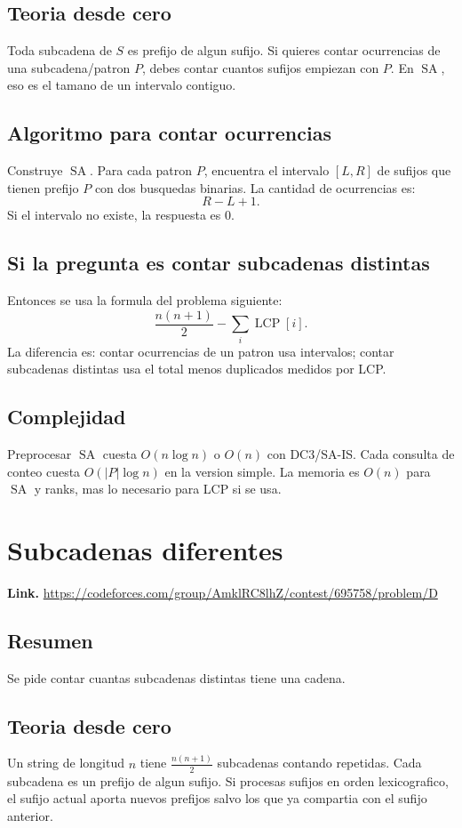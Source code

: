 \documentclass[10pt]{article}
\newcommand{\bigO}{O}
\newcommand{\SA}{\operatorname{SA}}
\newcommand{\LCP}{\operatorname{LCP}}
\begin{document}
\subsection*{Teoria desde cero}
Toda subcadena de $S$ es prefijo de algun sufijo. Si quieres contar ocurrencias
de una subcadena/patron $P$, debes contar cuantos sufijos empiezan con $P$. En
$\SA$, eso es el tamano de un intervalo contiguo.

\subsection*{Algoritmo para contar ocurrencias}
Construye $\SA$. Para cada patron $P$, encuentra el intervalo $[L,R]$ de sufijos
que tienen prefijo $P$ con dos busquedas binarias. La cantidad de ocurrencias es:
\[
R-L+1.
\]
Si el intervalo no existe, la respuesta es $0$.

\subsection*{Si la pregunta es contar subcadenas distintas}
Entonces se usa la formula del problema siguiente:
\[
\frac{n(n+1)}2-\sum_i \LCP[i].
\]
La diferencia es: contar ocurrencias de un patron usa intervalos; contar
subcadenas distintas usa el total menos duplicados medidos por LCP.

\subsection*{Complejidad}
Preprocesar $\SA$ cuesta $\bigO(n\log n)$ o $\bigO(n)$ con DC3/SA-IS. Cada
consulta de conteo cuesta $\bigO(|P|\log n)$ en la version simple. La memoria es
$\bigO(n)$ para $\SA$ y ranks, mas lo necesario para LCP si se usa.

\clearpage
\section{Subcadenas diferentes}
\textbf{Link.} \url{https://codeforces.com/group/AmklRC8lhZ/contest/695758/problem/D}

\subsection*{Resumen}
Se pide contar cuantas subcadenas distintas tiene una cadena.

\subsection*{Teoria desde cero}
Un string de longitud $n$ tiene $\frac{n(n+1)}2$ subcadenas contando repetidas.
Cada subcadena es un prefijo de algun sufijo. Si procesas sufijos en orden
lexicografico, el sufijo actual aporta nuevos prefijos salvo los que ya compartia
con el sufijo anterior.
\end{document}
